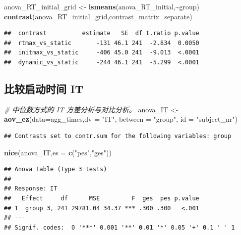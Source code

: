 \documentclass[
]{article}
\newenvironment{Shaded}{\begin{snugshade}}{\end{snugshade}}
\newcommand{\AttributeTok}[1]{\textcolor[rgb]{0.13,0.29,0.53}{#1}}
\newcommand{\CommentTok}[1]{\textcolor[rgb]{0.56,0.35,0.01}{\textit{#1}}}
\newcommand{\FunctionTok}[1]{\textcolor[rgb]{0.13,0.29,0.53}{\textbf{#1}}}
\newcommand{\NormalTok}[1]{#1}
\newcommand{\OtherTok}[1]{\textcolor[rgb]{0.56,0.35,0.01}{#1}}
\newcommand{\SpecialCharTok}[1]{\textcolor[rgb]{0.81,0.36,0.00}{\textbf{#1}}}
\newcommand{\StringTok}[1]{\textcolor[rgb]{0.31,0.60,0.02}{#1}}
\begin{document}
\begin{Shaded}
\begin{Highlighting}[]
\NormalTok{anova\_RT\_initial\_grid }\OtherTok{\textless{}{-}} \FunctionTok{lsmeans}\NormalTok{(anova\_RT\_initial,}\SpecialCharTok{\textasciitilde{}}\NormalTok{group)}
\FunctionTok{contrast}\NormalTok{(anova\_RT\_initial\_grid,contrast\_matrix\_separate)}
\end{Highlighting}
\end{Shaded}

\begin{verbatim}
##  contrast          estimate   SE  df t.ratio p.value
##  rtmax_vs_static       -131 46.1 241  -2.834  0.0050
##  initmax_vs_static     -406 45.0 241  -9.013  <.0001
##  dynamic_vs_static     -244 46.1 241  -5.299  <.0001
\end{verbatim}

\subsection{比较启动时间
IT}\label{ux6bd4ux8f83ux542fux52a8ux65f6ux95f4-it-1}

\begin{Shaded}
\begin{Highlighting}[]
\CommentTok{\# 中位数方式的 IT 方差分析与对比分析。}
\NormalTok{anova\_IT }\OtherTok{\textless{}{-}} \FunctionTok{aov\_ez}\NormalTok{(}\AttributeTok{data=}\NormalTok{agg\_times,}\AttributeTok{dv =} \StringTok{"IT"}\NormalTok{, }\AttributeTok{between =} \StringTok{"group"}\NormalTok{, }\AttributeTok{id =} \StringTok{"subject\_nr"}\NormalTok{)}
\end{Highlighting}
\end{Shaded}

\begin{verbatim}
## Contrasts set to contr.sum for the following variables: group
\end{verbatim}

\begin{Shaded}
\begin{Highlighting}[]
\FunctionTok{nice}\NormalTok{(anova\_IT,}\AttributeTok{es =} \FunctionTok{c}\NormalTok{(}\StringTok{"pes"}\NormalTok{,}\StringTok{"ges"}\NormalTok{))}
\end{Highlighting}
\end{Shaded}

\begin{verbatim}
## Anova Table (Type 3 tests)
## 
## Response: IT
##   Effect     df      MSE         F  ges  pes p.value
## 1  group 3, 241 29781.04 34.37 *** .300 .300   <.001
## ---
## Signif. codes:  0 '***' 0.001 '**' 0.01 '*' 0.05 '+' 0.1 ' ' 1
\end{verbatim}
\end{document}
